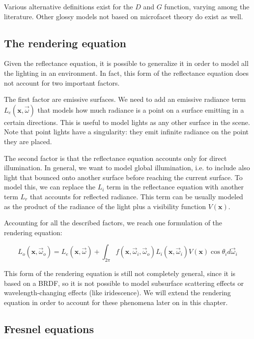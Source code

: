 Various alternative definitions exist for the $D$ and $G$ function, varying among the literature. Other glossy models not based on microfacet theory do exist as well. 

\subsection{The rendering equation}

Given the reflectance equation, it is possible to generalize it in order to model all the lighting in an environment. In fact, this form of the reflectance equation does not account for two important factors. 

The first factor are emissive surfaces. We need to add an emissive radiance term $L_e(\mathbf{x}, \vec{\omega})$ that models how much radiance is a point on a surface emitting in a certain directions. This is useful to model lights as any other surface in the scene. Note that point lights have a singularity: they emit infinite radiance on the point they are placed.

The second factor is that the reflectance equation accounts only for direct illumination. In general, we want to model global illumination, i.e. to include also light that bounced onto another surface before reaching the current surface. To model this, we can replace the $L_i$ term in the reflectance equation with another term $L_r$ that accounts for reflected radiance. This term can be usually modeled as the product of the radiance of the light plus a visibility function $V(\mathbf{x})$.

Accounting for all the described factors, we reach one formulation of the rendering equation:

$$
L_o(\mathbf{x}, \vec{\omega}_o) = L_e(\mathbf{x}, \vec{\omega}) + \int_{2\pi} f(\mathbf{x}, \vec{\omega}_i, \vec{\omega}_o) L_i(\mathbf{x}, \vec{\omega}_i) V(\mathbf{x}) \cos\theta_i d\vec{\omega}_i
$$

This form of the rendering equation is still not completely general, since it is based on a BRDF, so it is not possible to model subsurface scattering effects or wavelength-changing effects (like iridescence). We will extend the rendering equation in order to account for these phenomena later on in this chapter.

\subsection{Fresnel equations}

